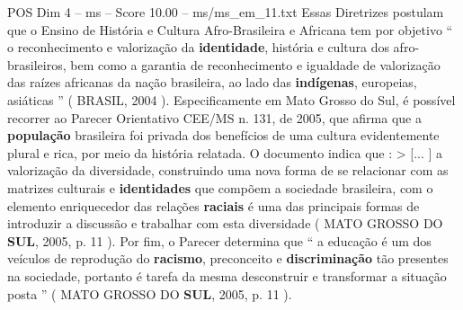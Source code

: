 \begin{textsample}{POS Dim 4 – ms – Score 10.00 – ms/ms\_em\_11.txt}
Essas Diretrizes postulam que o Ensino de História e Cultura Afro-Brasileira e Africana tem por objetivo “ o reconhecimento e valorização da \textbf{identidade}, história e cultura dos afro-brasileiros, bem como a garantia de reconhecimento e igualdade de valorização das raízes africanas da nação brasileira, ao lado das \textbf{indígenas}, europeias, asiáticas ” ( BRASIL, 2004 ).
Especificamente em Mato Grosso do Sul, é possível recorrer ao Parecer Orientativo CEE/MS n. 131, de 2005, que afirma que a \textbf{população} brasileira foi privada dos benefícios de uma cultura evidentemente plural e rica, por meio da história relatada.
O documento indica que : > [... ] a valorização da diversidade, construindo uma nova forma de se relacionar com as matrizes culturais e \textbf{identidades} que compõem a sociedade brasileira, com o elemento enriquecedor das relações \textbf{raciais} é uma das principais formas de introduzir a discussão e trabalhar com esta diversidade ( MATO GROSSO DO \textbf{SUL}, 2005, p. 11 ).
Por fim, o Parecer determina que “ a educação é um dos veículos de reprodução do \textbf{racismo}, preconceito e \textbf{discriminação} tão presentes na sociedade, portanto é tarefa da mesma desconstruir e transformar a situação posta ” ( MATO GROSSO DO \textbf{SUL}, 2005, p. 11 ).

\end{textsample}
